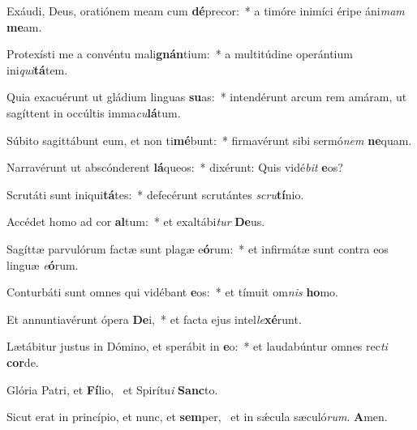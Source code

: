 \item Exáudi, Deus, oratiónem meam cum \textbf{dé}precor:~* a timóre inimíci éripe áni\textit{mam} \textbf{me}am.
\item Protexísti me a convéntu mali\textbf{gnán}tium:~* a multitúdine operántium ini\textit{qui}\textbf{tá}tem.
\item Quia exacuérunt ut gládium linguas \textbf{su}as:~* intendérunt arcum rem amáram, ut sagíttent in occúltis imma\textit{cu}\textbf{lá}tum.
\item Súbito sagittábunt eum, et non ti\textbf{mé}bunt:~* firmavérunt sibi sermó\textit{nem} \textbf{ne}quam.
\item Narravérunt ut abscónderent \textbf{lá}queos:~* dixérunt: Quis vidé\textit{bit} \textbf{e}os?
\item Scrutáti sunt iniqui\textbf{tá}tes:~* defecérunt scrutántes \textit{scru}\textbf{tí}nio.
\item Accédet homo ad cor \textbf{al}tum:~* et exaltábi\textit{tur} \textbf{De}us.
\item Sagíttæ parvulórum factæ sunt plagæ e\textbf{ó}rum:~* et infirmátæ sunt contra eos linguæ \textit{e}\textbf{ó}rum.
\item Conturbáti sunt omnes qui vidébant \textbf{e}os:~* et tímuit om\textit{nis} \textbf{ho}mo.
\item Et annuntiavérunt ópera \textbf{De}i,~* et facta ejus intel\textit{le}\textbf{xé}runt.
\item Lætábitur justus in Dómino, et sperábit in \textbf{e}o:~* et laudabúntur omnes rec\textit{ti} \textbf{cor}de.
\item Glória Patri, et \textbf{Fí}lio,~\psstar{} et Spirítu\textit{i} \textbf{Sanc}to.
\item Sicut erat in princípio, et nunc, et \textbf{sem}per,~\psstar{} et in sǽcula sæculó\textit{rum}. \textbf{A}men.